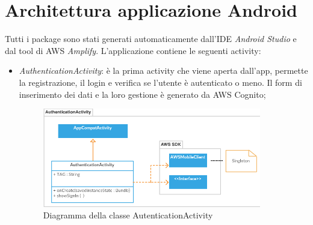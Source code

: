 \pagebreak
\section{Architettura applicazione Android}
Tutti i package sono stati generati automaticamente dall'IDE \emph{Android Studio} e dal tool di AWS \emph{Amplify}. L'applicazione contiene le seguenti activity:

\begin{itemize}
    \item \emph{AuthenticationActivity}: è la prima activity che viene aperta dall'app, permette la registrazione, il login e verifica se l'utente è autenticato o meno. Il form di inserimento dei dati e la loro gestione è generato da AWS Cognito;
        \begin{figure}[H]
        \begin{center}
            \includegraphics[width=0.9\textwidth, keepaspectratio]{../includes/pics/authenticationactivity.png}
            \caption{Diagramma della classe AutenticationActivity}
        \end{center}
        \end{figure}


\end{itemize}
